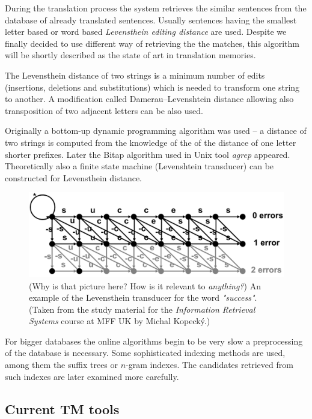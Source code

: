 During the translation process the system retrieves the similar sentences from the database of already translated sentences. Usually sentences having the smallest letter based or word based \emph{Levensthein editing distance} are used. Despite we finally decided to use different way of retrieving the the matches, this algorithm will be shortly described as the state of art in translation memories.

The Levensthein distance of two strings is a minimum number of edits (insertions, deletions and substitutions) which is needed to transform one string to another. A modification called Damerau–Levenshtein distance allowing also transposition of two adjacent letters can be also used.

Originally a bottom-up dynamic programming algorithm was used -- a distance of two strings is computed from the knowledge of the of the distance of one letter shorter prefixes. Later the Bitap algorithm used in Unix tool \emph{agrep} appeared. Theoretically also a finite state machine (Levenshtein transducer) can be constructed for Levensthein distance.

\begin{figure}
\begin{center}
\includegraphics[scale=0.65]{./figures/levensthein.pdf}
\end{center}

\caption{(Why is that picture here? How is it relevant to \emph{anything?}) An example of the Levensthein transducer for the word \emph{"success"}. (Taken from the study material for the \emph{Information Retrieval Systems} course at MFF UK by Michal Kopecký.)}
\end{figure}

For bigger databases the online algorithms begin to be very slow a preprocessing of the database is necessary. Some sophisticated indexing methods are used, among them the suffix trees or $n$-gram indexes. The candidates retrieved from such indexes are later examined more carefully.

\subsection{Current TM tools}

